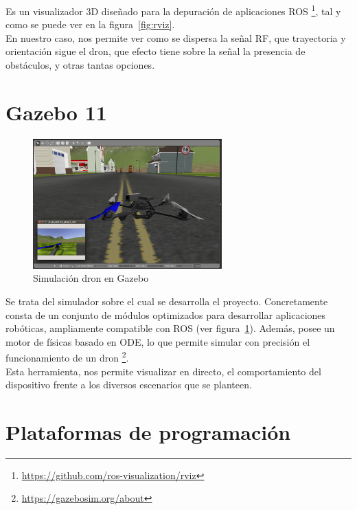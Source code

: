Es un visualizador 3D diseñado para la depuración de aplicaciones \ac{ROS} \footnote[7]{\url{https://github.com/ros-visualization/rviz}}, tal y como se puede ver en la figura~\ref{fig:rviz}.\\

En nuestro caso, nos permite ver como se dispersa la señal \ac{RF}, que trayectoria y orientación sigue el dron, que efecto tiene sobre la señal la presencia de obstáculos, y otras tantas opciones.\\

\section{Gazebo 11}
\label{sec:gazebo}

\begin{figure} [tp]
	\begin{center}
	\includegraphics[height=5cm]{imagenes/cap3/2_gazebo_drone.png}
	\end{center}
	\caption[Simulación dron en Gazebo]{Simulación dron en Gazebo}
	\label{fig:gazebo}
\end{figure}

Se trata del simulador sobre el cual se desarrolla el proyecto. Concretamente consta de un conjunto de módulos optimizados para desarrollar aplicaciones robóticas, ampliamente compatible con \ac{ROS} (ver figura~\ref{fig:gazebo}). Además, posee un motor de físicas basado en ODE, lo que permite simular con precisión el funcionamiento de un dron \footnote[8]{\url{https://gazebosim.org/about}}.\\

Esta herramienta, nos permite visualizar en directo, el comportamiento del dispositivo frente a los diversos escenarios que se planteen.

\section{Plataformas de programación}
\label{sec:plataformas_de_programacion}

